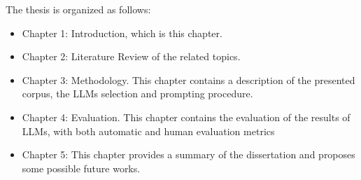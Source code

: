The thesis is organized as follows:
\begin{itemize}
    \item Chapter 1: Introduction, which is this chapter.
    \item Chapter 2: Literature Review of the related topics.
    \item Chapter 3: Methodology. This chapter contains a description of the presented corpus, the LLMs selection and prompting procedure.
    \item Chapter 4: Evaluation. This chapter contains the evaluation of the results of LLMs, with both automatic and human evaluation metrics
    \item Chapter 5: This chapter provides a summary of the dissertation and proposes some possible future works.
\end{itemize}


